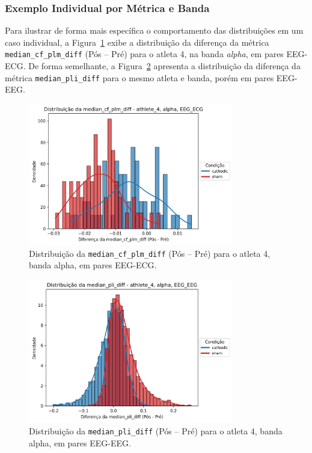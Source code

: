 \subsubsection{Exemplo Individual por Métrica e Banda}
Para ilustrar de forma mais específica o comportamento das distribuições em um caso individual, a Figura~\ref{fig:median_cf_plm_diff_ath4_alpha_eeg_ecg} exibe a distribuição da diferença da métrica \texttt{median\_cf\_plm\_diff} (Pós -- Pré) para o atleta 4, na banda \emph{alpha}, em pares EEG-ECG. De forma semelhante, a Figura~\ref{fig:median_pli_diff_ath4_alpha_eeg_eeg} apresenta a distribuição da diferença da métrica \texttt{median\_pli\_diff} para o mesmo atleta e banda, porém em pares EEG-EEG.

\begin{figure}[htb]
    \centering
    \includegraphics[width=0.8\textwidth]{figs/5_connectivity_metrics_individual_distribution/median_cf_plm_diff_athlete_4_alpha_EEG_ECG.png}
    \caption{Distribuição da \texttt{median\_cf\_plm\_diff} (Pós -- Pré) para o atleta 4, banda alpha, em pares EEG-ECG.}
    \label{fig:median_cf_plm_diff_ath4_alpha_eeg_ecg}
\end{figure}

\begin{figure}[htb]
    \centering
    \includegraphics[width=0.8\textwidth]{figs/5_connectivity_metrics_individual_distribution/median_pli_diff_athlete_4_alpha_EEG_EEG.png}
    \caption{Distribuição da \texttt{median\_pli\_diff} (Pós -- Pré) para o atleta 4, banda alpha, em pares EEG-EEG.}
    \label{fig:median_pli_diff_ath4_alpha_eeg_eeg}
\end{figure}

